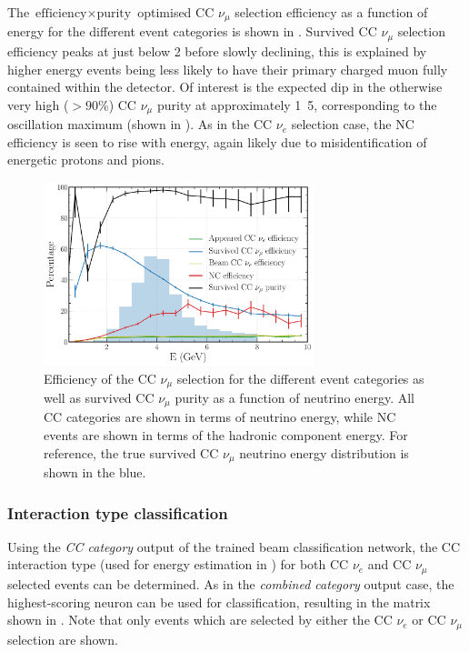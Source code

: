 The $\text{efficiency}\times\text{purity}$ optimised CC $\nu_{\mu}$ selection efficiency as a
function of energy for the different event categories is shown in
. Survived CC $\nu_{\mu}$ selection efficiency peaks at just below
\unit{2}{\GeV} before slowly declining, this is explained by higher energy events being less
likely to have their primary charged muon fully contained within the detector. Of interest is the
expected dip in the otherwise very high ($>90\%$) CC $\nu_{\mu}$ purity at approximately
\unit{1.5}{\GeV}, corresponding to the oscillation maximum (shown in
). As in the CC $\nu_{e}$ selection case, the NC efficiency is seen to
rise with energy, again likely due to misidentification of energetic protons and pions.

\begin{figure} %
    \includegraphics[width=0.7\textwidth]{diagrams/7-results/final_numu_hists.pdf}
    \caption[Efficiency of the CC $\nu_{\mu}$ selection as a function of energy]
    {Efficiency of the CC $\nu_{\mu}$ selection for the different event categories as well as
        survived CC $\nu_{\mu}$ purity as a function of neutrino energy. All CC categories are
        shown in terms of neutrino energy, while NC events are shown in terms of the hadronic
        component energy. For reference, the true survived CC $\nu_{\mu}$ neutrino energy
        distribution is shown in the blue.}
    \label{fig:final_numu_hists}
\end{figure}

\subsubsection*{Interaction type classification} %

Using the \emph{CC category} output of the trained beam classification network, the CC interaction
type (used for energy estimation in ) for both CC $\nu_{e}$
and CC $\nu_{\mu}$ selected events can be determined. As in the \emph{combined category} output
case, the highest-scoring neuron can be used for classification, resulting in the matrix shown in
. Note that only events which are selected by either the CC
$\nu_{e}$ or CC $\nu_{\mu}$ selection are shown.

